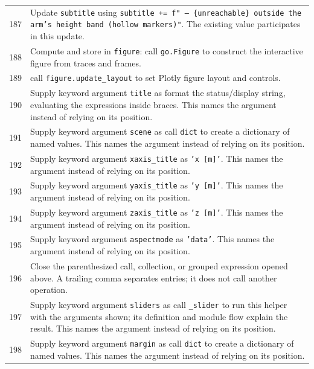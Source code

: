 \documentclass[11pt,a4paper]{book}
\begin{document}
\begin{longtable}{r p{}}
187 & Update \texttt{subtitle} using \texttt{subtitle += f" -- \{unreachable\} outside the arm's height band (hollow markers)"}. The existing value participates in this update. \\

188 & Compute and store in \texttt{figure}: call \texttt{go.Figure} to construct the interactive figure from traces and frames.  \\

189 & call \texttt{figure.update\_layout} to set Plotly figure layout and controls. \\

190 & Supply keyword argument \texttt{title} as format the status/display string, evaluating the expressions inside braces. This names the argument instead of relying on its position. \\

191 & Supply keyword argument \texttt{scene} as call \texttt{dict} to create a dictionary of named values. This names the argument instead of relying on its position. \\

192 & Supply keyword argument \texttt{xaxis\_title} as \texttt{'x [m]'}. This names the argument instead of relying on its position. \\

193 & Supply keyword argument \texttt{yaxis\_title} as \texttt{'y [m]'}. This names the argument instead of relying on its position. \\

194 & Supply keyword argument \texttt{zaxis\_title} as \texttt{'z [m]'}. This names the argument instead of relying on its position. \\

195 & Supply keyword argument \texttt{aspectmode} as \texttt{'data'}. This names the argument instead of relying on its position. \\

196 & Close the parenthesized call, collection, or grouped expression opened above. A trailing comma separates entries; it does not call another operation. \\

197 & Supply keyword argument \texttt{sliders} as call \texttt{\_slider} to run this helper with the arguments shown; its definition and module flow explain the result. This names the argument instead of relying on its position. \\

198 & Supply keyword argument \texttt{margin} as call \texttt{dict} to create a dictionary of named values. This names the argument instead of relying on its position. \\


\end{longtable}
\end{document}
